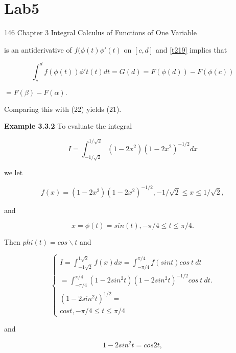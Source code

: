 \chapter{Lab5}
\begin{flushleft}


146 Chapter 3 Integral Calculus of Functions of One Variable

is an antiderivative of $f(\phi(t) \phi' (t) $ on  $[c,d]$
and \ref{t219} implies that

\begin{equation}
  \int_c^d   f(\phi(t))\phi't (t) dt = G(d) = F(\phi (d)) - F(\phi(c) )  
\end{equation}

        

\begin{center}
$=F( \beta ) - F( \alpha ).$
\end{center}
Comparing this with (22) yields (21).


\textbf{Example 3.3.2} To evaluate the integral


$$
I =  \int_{-1/\sqrt2}^{1/\sqrt2} (1 -2  x^{2}) (1 -2  x^{2})^{-1/2} dx
$$

we let 

$$
f(x) = (1 -2  x^{2}) (1 -2  x^{2})^{-1/2} , -1/\sqrt 2 \leq x \leq 1/\sqrt 2 , 
$$

and 

$$
x = \phi(t) = sin(t) , -\pi/4 \leq t \leq \pi/4. 
$$


Then $phi (t) = cos \backslash t $ and 

\begin{equation*}
\begin{cases}
    I =  \int_ {-1\sqrt2}^{1\sqrt2}  f(x) dx  =  \int_{-\pi/4}^{\pi/4} f(sint) cos\ t \ dt \\
= \int_{-\pi/4}^{\pi/4} (1-2sin^2 t)(1-2sin^2 t)^{-1/2} cos \ t  \ dt.  \\
(1-2sin^2 t)^{1/2} =    \\

cost,-\pi/4 \leq t \leq \pi/4 

\end{cases}
\end{equation*}







and 

$$
1-2sin^2 t = cos2t,
$$


\end{flushleft}
